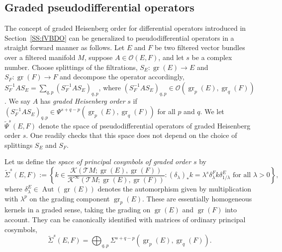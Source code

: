 \documentclass[reqno,12pt]{amsart}
\DeclareMathOperator{\gr}{gr}
\DeclareMathOperator{\Aut}{Aut}
\theoremstyle{plain}
\theoremstyle{definition}
\begin{document}
\subsection{Graded pseudodifferential operators}\label{SS:gradedhypo} 





The concept of graded Heisenberg order for differential operators introduced in Section~\ref{SS:fVBDO} can be generalized to pseudodifferential operators in a straight forward manner as follows.
Let $E$ and $F$ be two filtered vector bundles over a filtered manifold $M$, suppose $A\in\mathcal O(E,F)$, and let $s$ be a complex number.
Choose splittings of the filtrations, $S_E\colon\gr(E)\to E$ and $S_F\colon\gr(F)\to F$ and decompose the operator accordingly, $S_F^{-1}AS_E=\sum_{q,p}(S_F^{-1}AS_E)_{q,p}$, where $(S_F^{-1}AS_E)_{q,p}\in\mathcal O(\gr_p(E),\gr_q(F))$.
We say $A$ has \emph{graded Heisenberg order} $s$ if $(S_F^{-1}AS_E)_{q,p}\in\Psi^{s+q-p}(\gr_p(E),\gr_q(F))$ for all $p$ and $q$.
We let $\tilde\Psi^s(E,F)$ denote the space of pseudodifferential operators of graded Heisenberg order $s$.
One readily checks that this space does not depend on the choice of splittings $S_E$ and $S_F$.


Let us define the \emph{space of principal cosymbols of graded order $s$} by
$$
\tilde\Sigma^s(E,F)
:=\left\{k\in\frac{\mathcal K(\mathcal TM;\gr(E),\gr(F))}{\mathcal K^\infty(\mathcal TM;\gr(E),\gr(F))}:\textrm{$(\delta_\lambda)_*k=\lambda^s\delta_\lambda^Fk\delta^E_{1/\lambda}$ for all $\lambda>0$}\right\},
$$
where $\delta^E_\lambda\in\Aut(\gr(E))$ denotes the automorphism given by multiplication with $\lambda^p$ on the grading component $\gr_p(E)$.
These are essentially homogeneous kernels in a graded sense, taking the grading on $\gr(E)$ and $\gr(F)$ into account.
They can be canonically identified with matrices of ordinary principal cosymbols,
\begin{equation}\label{E:tSigma}
\tilde\Sigma^s(E,F)=\bigoplus_{q,p}\Sigma^{s+q-p}(\gr_p(E),\gr_q(F)).
\end{equation}
\end{document}
